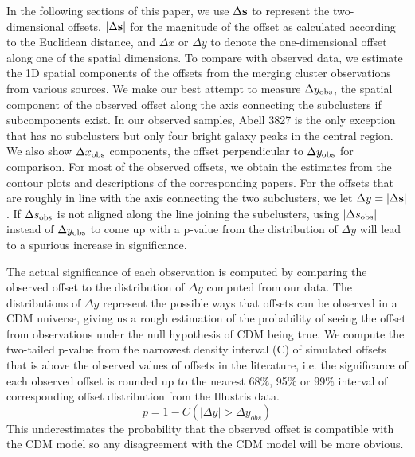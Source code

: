 In the following sections of this paper, we use $\Delta {\bf s}$  to represent the
two-dimensional offsets, $|\Delta {\bf s}|$ for the magnitude of the offset as calculated
according to the Euclidean distance, and $\Delta x$ or $\Delta y$ to denote the
one-dimensional offset along one of the spatial dimensions.
To compare with observed data, we estimate the 1D spatial components of
the offsets from the merging cluster observations from various sources.   
We make our best attempt to measure $\Delta y_{\rm obs}$, the spatial component of the
observed offset along the axis connecting the subclusters if subcomponents exist. 
In our observed samples, Abell 3827 is the only exception that has no
subclusters but only four bright galaxy peaks in the central region. 
We also show $\Delta x_{\rm obs}$ components, the offset perpendicular to
$\Delta y_{\rm obs}$ for comparison.
For most of the observed offsets, we obtain the estimates from the contour plots 
and descriptions of the corresponding papers. 
For the offsets that are roughly in line with the axis connecting the two subclusters,
we let $\Delta y = |\Delta {\bf s}|$. 
If $\Delta s_{\rm obs}$ is not aligned along the line joining the subclusters,
using $|\Delta s_{\rm obs}|$ instead of $\Delta y_{\rm obs}$ to come 
up with a p-value from the distribution of 
$\Delta y$ will lead to a spurious increase in significance.

The actual significance of each observation is computed by comparing the
observed offset to the distribution of $\Delta y$ computed from our data. 
The distributions of $\Delta y$ represent the possible ways that offsets can be observed in a CDM
universe, giving us a rough estimation of the probability 
of seeing the offset from observations under the null hypothesis of CDM 
being true. 
We compute the two-tailed 
p-value from the narrowest density interval (C) of simulated offsets 
that is above the observed values of offsets in the literature, 
i.e. the significance of each observed offset is rounded up to the nearest 68\%, 95\% or 99\%
interval of corresponding offset distribution from the Illustris data. 
\begin{equation}
	p = 1 - C(|\Delta y| > \Delta y_{obs})
\end{equation}
This underestimates the probability that the
observed offset is compatible with the CDM model so
any disagreement with the CDM model will be more obvious. 

 
